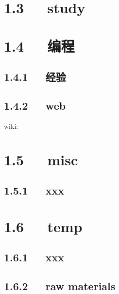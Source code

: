 \documentclass[letterpaper,12pt,english]{sphinxmanual}
\begin{document}
\section{1.3   study}
\label{\detokenize{000misc/memo:study}}

\section{1.4   编程}
\label{\detokenize{000misc/memo:id3}}

\subsection{1.4.1   经验}
\label{\detokenize{000misc/memo:id4}}

\subsection{1.4.2   web}
\label{\detokenize{000misc/memo:web}}
wiki:





\section{1.5   misc}
\label{\detokenize{000misc/memo:misc}}

\subsection{1.5.1   xxx}
\label{\detokenize{000misc/memo:id5}}

\section{1.6   temp}
\label{\detokenize{000misc/memo:temp}}

\subsection{1.6.1   xxx}
\label{\detokenize{000misc/memo:id6}}

\subsection{1.6.2   raw materials}
\label{\detokenize{000misc/memo:raw-materials}}
\end{document}

